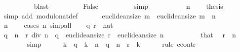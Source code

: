 \begin{isabellebody}
\ \ \ \ \ \ \ \ \isamarkupfalse%
\ blast\isanewline
\ \ \ \ \ \ \isamarkupfalse%
\ \isamarkupfalse%
\ False\isanewline
\ \ \ \ \ \ \ \ \isamarkupfalse%
\ simp\isanewline
\ \ \ \ \isamarkupfalse%
\isanewline
\ \ \ \ \isamarkupfalse%
\ {\isacartoucheopen}n\ {\isasymnoteq}\ {}{\isacartoucheclose}\ \isamarkupfalse%
\ {\isacharquery}{\kern0pt}thesis\isanewline
\ \ \ \ \ \ \isamarkupfalse%
\ {\isacharparenleft}{\kern0pt}simp\ add{\isacharcolon}{\kern0pt}\ modulo{\isacharunderscore}{\kern0pt}nat{\isacharunderscore}{\kern0pt}def{\isacharparenright}{\kern0pt}\isanewline
\ \ \isamarkupfalse%
\isanewline
\ \ \isamarkupfalse%
\ {\isachardoublequoteopen}euclidean{\isacharunderscore}{\kern0pt}size\ m\ {\isasymle}\ euclidean{\isacharunderscore}{\kern0pt}size\ {\isacharparenleft}{\kern0pt}m\ {\isacharasterisk}{\kern0pt}\ n{\isacharparenright}{\kern0pt}{\isachardoublequoteclose}\isanewline
\ \ \ \ \isamarkupfalse%
\ {\isacartoucheopen}n\ {\isasymnoteq}\ {}{\isacartoucheclose}\ \isamarkupfalse%
\ {\isacharparenleft}{\kern0pt}cases\ n{\isacharparenright}{\kern0pt}\ simp{\isacharunderscore}{\kern0pt}all\isanewline
\ \ \isamarkupfalse%
\ q\ r\ {\isacharcolon}{\kern0pt}{\isacharcolon}{\kern0pt}\ nat\isanewline
\ \ \isamarkupfalse%
\ {\isachardoublequoteopen}{\isacharparenleft}{\kern0pt}q\ {\isacharasterisk}{\kern0pt}\ n\ {\isacharplus}{\kern0pt}\ r{\isacharparenright}{\kern0pt}\ div\ n\ {\isacharequal}{\kern0pt}\ q{\isachardoublequoteclose}\ \ {\isachardoublequoteopen}euclidean{\isacharunderscore}{\kern0pt}size\ r\ {\isacharless}{\kern0pt}\ euclidean{\isacharunderscore}{\kern0pt}size\ n{\isachardoublequoteclose}\isanewline
\ \ \isamarkupfalse%
\ {\isacharminus}{\kern0pt}\isanewline
\ \ \ \ \isamarkupfalse%
\ that\ \isamarkupfalse%
\ {\isachardoublequoteopen}r\ {\isacharless}{\kern0pt}\ n{\isachardoublequoteclose}\isanewline
\ \ \ \ \ \ \isamarkupfalse%
\ simp\isanewline
\ \ \ \ \isamarkupfalse%
\ {\isachardoublequoteopen}k\ {\isasymle}\ q{\isachardoublequoteclose}\ \ {\isachardoublequoteopen}k\ {\isacharasterisk}{\kern0pt}\ n\ {\isasymle}\ q\ {\isacharasterisk}{\kern0pt}\ n\ {\isacharplus}{\kern0pt}\ r{\isachardoublequoteclose}\ \ k\isanewline
\ \ \ \ \isamarkupfalse%
\ {\isacharparenleft}{\kern0pt}rule\ ccontr{\isacharparenright}{\kern0pt}\isanewline

\end{isabellebody}
